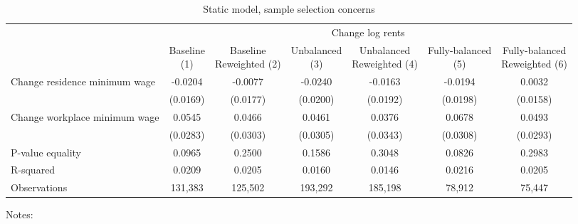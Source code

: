 \begin{table}
    \caption{Static model, sample selection concerns}
    \label{tab:static_sample}

    \begin{tabular}{@{}lcccccc@{}}
        \toprule
                                             & \multicolumn{6}{c}{Change log rents}                                     \\ \cmidrule(l){2-7} 
                                             & \shortstack{Baseline\\(1)}       & \shortstack{Baseline\\Reweighted (2)}
                                             & \shortstack{Unbalanced\\(3)}     & \shortstack{Unbalanced\\Reweighted (4)}
                                             & \shortstack{Fully-balanced\\(5)} & \shortstack{Fully-balanced\\Reweighted (6)}  \\ \midrule
        Change residence minimum wage        & -0.0204      & -0.0077        & -0.0240       & -0.0163      & -0.0194     & 0.0032            \\
                                             & (0.0169)    & (0.0177)      & (0.0200)     & (0.0192)    & (0.0198)   & (0.0158)          \\
        Change workplace minimum wage        & 0.0545      & 0.0466        & 0.0461       & 0.0376      & 0.0678     & 0.0493            \\
                                             & (0.0283)    & (0.0303)      & (0.0305)     & (0.0343)    & (0.0308)   & (0.0293)          \\ \midrule
        P-value equality                     & 0.0965      & 0.2500        & 0.1586       & 0.3048      & 0.0826     & 0.2983            \\
        R-squared                            & 0.0209      & 0.0205        & 0.0160       & 0.0146      & 0.0216     & 0.0205            \\
        Observations                         & 131,383     & 125,502       & 193,292      & 185,198     & 78,912    & 75,447           \\ \bottomrule
    \end{tabular}

    \begin{minipage}{.95\textwidth} \footnotesize
        \vspace{2mm}
        Notes: 
    \end{minipage}
\end{table}
